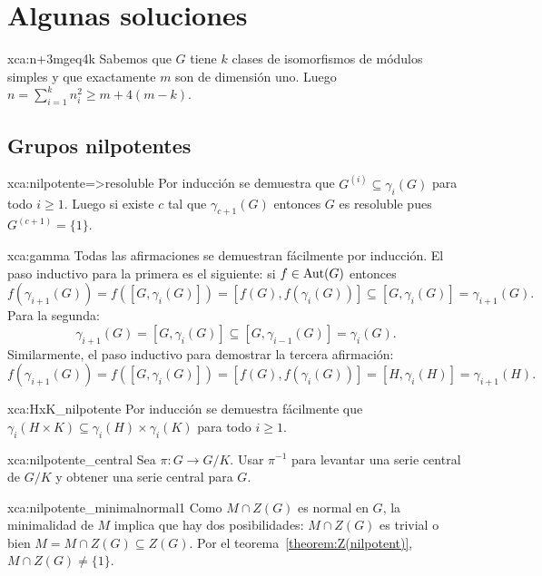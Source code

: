 \chapter*{Algunas soluciones}

\begin{sol}{xca:n+3mgeq4k}
     Sabemos que $G$ tiene $k$ clases de isomorfismos de módulos simples y que exactamente 
     $m$ son de dimensión uno. Luego $n=\sum_{i=1}^kn_i^2\geq m+4(m-k)$. 
\end{sol}

\section*{Grupos nilpotentes}

\begin{sol}{xca:nilpotente=>resoluble}
	Por inducción se demuestra que $G^{(i)}\subseteq\gamma_i(G)$ para todo
	$i\geq1$. Luego si existe $c$ tal que $\gamma_{c+1}(G)$ entonces $G$ es
	resoluble pues $G^{(c+1)}=\{1\}$.
\end{sol}

\begin{sol}{xca:gamma}
	Todas las afirmaciones se demuestran fácilmente por inducción. El paso
	inductivo para la primera es el siguiente: si $f\in\operatorname{Aut}(G)$ entonces
	\[
		f(\gamma_{i+1}(G))
		=f([G,\gamma_i(G)])
		=[f(G),f(\gamma_i(G))]\subseteq [G,\gamma_i(G)]
		=\gamma_{i+1}(G).
	\]
	Para la segunda:
	\[
		\gamma_{i+1}(G)=[G,\gamma_i(G)]\subseteq [G,\gamma_{i-1}(G)]=\gamma_{i}(G).
	\]
	Similarmente, el paso inductivo para demostrar la tercera afirmación:
	\[
		f(\gamma_{i+1}(G))=f([G,\gamma_i(G)])=[f(G),f(\gamma_i(G))]=[H,\gamma_i(H)]=\gamma_{i+1}(H).
	\]
\end{sol}

\begin{sol}{xca:HxK_nilpotente}
	Por inducción se demuestra fácilmente que $\gamma_i(H\times
	K)\subseteq\gamma_i(H)\times\gamma_i(K)$ para todo $i\geq1$. 
\end{sol}

\begin{sol}{xca:nilpotente_central}
	Sea $\pi\colon G\to G/K$. Usar $\pi^{-1}$ para levantar una serie central de $G/K$ y obtener una serie central para $G$.
\end{sol}

\begin{sol}{xca:nilpotente_minimalnormal1}
 	Como $M\cap Z(G)$ es normal en $G$, la minimalidad de $M$ implica que hay
 	dos posibilidades: $M\cap Z(G)$ es trivial o bien $M=M\cap Z(G)\subseteq Z(G)$.
 	Por el teorema~\ref{theorem:Z(nilpotent)}, $M\cap Z(G)\ne \{1\}$.
\end{sol}

